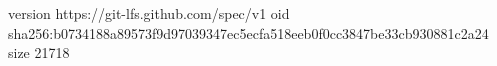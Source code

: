 version https://git-lfs.github.com/spec/v1
oid sha256:b0734188a89573f9d97039347ec5ecfa518eeb0f0cc3847be33cb930881c2a24
size 21718
